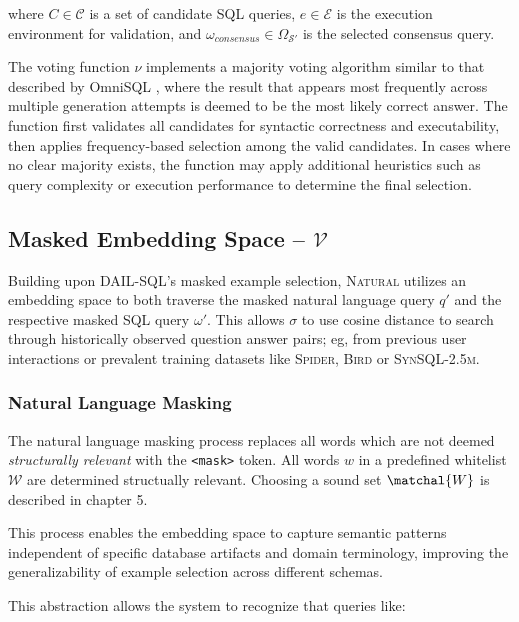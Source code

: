 where $C \in \mathcal{C}$ is a set of candidate SQL queries, $e \in \mathcal{E}$ is
the execution environment for validation, and $\omega_{consensus} \in \Omega_{\mathcal{S}'}$
is the selected consensus query.

\vspace{0.5em}

The voting function $\nu$ implements a majority voting algorithm similar to that
described by OmniSQL \citep{OmniSQL}, where the result that appears most frequently
across multiple generation attempts is deemed to be the most likely correct answer.
The function first validates all candidates for syntactic correctness and executability,
then applies frequency-based selection among the valid candidates. In cases where
no clear majority exists, the function may apply additional heuristics such as query
complexity or execution performance to determine the final selection.

\subsection{Masked Embedding Space – $\mathcal{V}$}

Building upon DAIL-SQL's masked example selection, \textsc{Natural} utilizes an
embedding space to both traverse the masked natural language query $q'$
and the respective masked SQL query $\omega'$. This allows $\sigma$ to use
cosine distance to search through historically observed question answer pairs;
eg, from previous user interactions or prevalent training datasets like
\textsc{Spider}, \textsc{Bird} or \textsc{SynSQL-2.5m}.

\subsubsection{Natural Language Masking}

The natural language masking process replaces all words which are not deemed
\textit{structurally relevant} with the \texttt{<mask>} token. All words $w$
in a predefined whitelist $\mathcal{W}$ are determined structually relevant.
Choosing a sound set $\matchal{W}$ is described in chapter 5.

This process enables the embedding space to capture semantic patterns independent
of specific database artifacts and domain terminology, improving the generalizability
of example selection across different schemas.

This abstraction allows the system to recognize that queries like:

